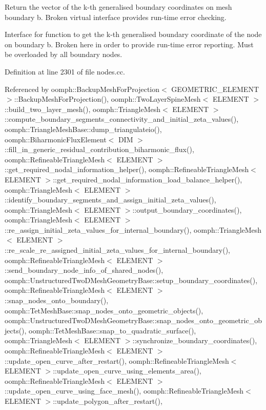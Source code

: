 Return the vector of the k-\/th generalised boundary coordinates on mesh boundary b. Broken virtual interface provides run-\/time error checking. 

Interface for function to get the k-\/th generalised boundary coordinate of the node on boundary b. Broken here in order to provide run-\/time error reporting. Must be overloaded by all boundary nodes. 

Definition at line 2301 of file nodes.\+cc.



Referenced by oomph\+::\+Backup\+Mesh\+For\+Projection$<$ G\+E\+O\+M\+E\+T\+R\+I\+C\+\_\+\+E\+L\+E\+M\+E\+N\+T $>$\+::\+Backup\+Mesh\+For\+Projection(), oomph\+::\+Two\+Layer\+Spine\+Mesh$<$ E\+L\+E\+M\+E\+N\+T $>$\+::build\+\_\+two\+\_\+layer\+\_\+mesh(), oomph\+::\+Triangle\+Mesh$<$ E\+L\+E\+M\+E\+N\+T $>$\+::compute\+\_\+boundary\+\_\+segments\+\_\+connectivity\+\_\+and\+\_\+initial\+\_\+zeta\+\_\+values(), oomph\+::\+Triangle\+Mesh\+Base\+::dump\+\_\+triangulateio(), oomph\+::\+Biharmonic\+Flux\+Element$<$ D\+I\+M $>$\+::fill\+\_\+in\+\_\+generic\+\_\+residual\+\_\+contribution\+\_\+biharmonic\+\_\+flux(), oomph\+::\+Refineable\+Triangle\+Mesh$<$ E\+L\+E\+M\+E\+N\+T $>$\+::get\+\_\+required\+\_\+nodal\+\_\+information\+\_\+helper(), oomph\+::\+Refineable\+Triangle\+Mesh$<$ E\+L\+E\+M\+E\+N\+T $>$\+::get\+\_\+required\+\_\+nodal\+\_\+information\+\_\+load\+\_\+balance\+\_\+helper(), oomph\+::\+Triangle\+Mesh$<$ E\+L\+E\+M\+E\+N\+T $>$\+::identify\+\_\+boundary\+\_\+segments\+\_\+and\+\_\+assign\+\_\+initial\+\_\+zeta\+\_\+values(), oomph\+::\+Triangle\+Mesh$<$ E\+L\+E\+M\+E\+N\+T $>$\+::output\+\_\+boundary\+\_\+coordinates(), oomph\+::\+Triangle\+Mesh$<$ E\+L\+E\+M\+E\+N\+T $>$\+::re\+\_\+assign\+\_\+initial\+\_\+zeta\+\_\+values\+\_\+for\+\_\+internal\+\_\+boundary(), oomph\+::\+Triangle\+Mesh$<$ E\+L\+E\+M\+E\+N\+T $>$\+::re\+\_\+scale\+\_\+re\+\_\+assigned\+\_\+initial\+\_\+zeta\+\_\+values\+\_\+for\+\_\+internal\+\_\+boundary(), oomph\+::\+Refineable\+Triangle\+Mesh$<$ E\+L\+E\+M\+E\+N\+T $>$\+::send\+\_\+boundary\+\_\+node\+\_\+info\+\_\+of\+\_\+shared\+\_\+nodes(), oomph\+::\+Unstructured\+Two\+D\+Mesh\+Geometry\+Base\+::setup\+\_\+boundary\+\_\+coordinates(), oomph\+::\+Refineable\+Triangle\+Mesh$<$ E\+L\+E\+M\+E\+N\+T $>$\+::snap\+\_\+nodes\+\_\+onto\+\_\+boundary(), oomph\+::\+Tet\+Mesh\+Base\+::snap\+\_\+nodes\+\_\+onto\+\_\+geometric\+\_\+objects(), oomph\+::\+Unstructured\+Two\+D\+Mesh\+Geometry\+Base\+::snap\+\_\+nodes\+\_\+onto\+\_\+geometric\+\_\+objects(), oomph\+::\+Tet\+Mesh\+Base\+::snap\+\_\+to\+\_\+quadratic\+\_\+surface(), oomph\+::\+Triangle\+Mesh$<$ E\+L\+E\+M\+E\+N\+T $>$\+::synchronize\+\_\+boundary\+\_\+coordinates(), oomph\+::\+Refineable\+Triangle\+Mesh$<$ E\+L\+E\+M\+E\+N\+T $>$\+::update\+\_\+open\+\_\+curve\+\_\+after\+\_\+restart(), oomph\+::\+Refineable\+Triangle\+Mesh$<$ E\+L\+E\+M\+E\+N\+T $>$\+::update\+\_\+open\+\_\+curve\+\_\+using\+\_\+elements\+\_\+area(), oomph\+::\+Refineable\+Triangle\+Mesh$<$ E\+L\+E\+M\+E\+N\+T $>$\+::update\+\_\+open\+\_\+curve\+\_\+using\+\_\+face\+\_\+mesh(), oomph\+::\+Refineable\+Triangle\+Mesh$<$ E\+L\+E\+M\+E\+N\+T $>$\+::update\+\_\+polygon\+\_\+after\+\_\+restart(), 